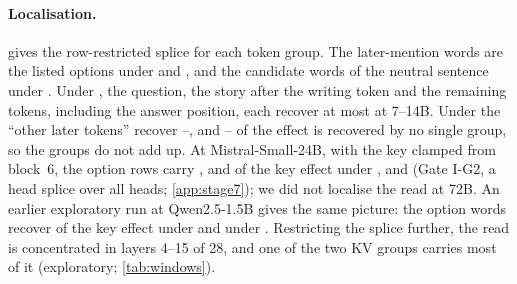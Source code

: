 \begin{table}[!ht]
\centering
\caption{\textbf{Identity, not belief role.} Role effect: mean change in $m = \log p(\text{initial}) - \log p(\textsc{loc})$ when the observer and non-observer are swapped with the same location word (nats). $f_K$, $f_V$: fraction of that change reproduced by clamping only the writing token's key or value (all layers) to the role-swapped run's, as a ratio of means. Direct question; $n = 150$ stories per format and model; 95\% bootstrap CIs. Preregistration E (E2) for \fmtOpt{} and \fmtNone{} in the four 7--14B models; \fmtLetter{} and Qwen2.5-72B exploratory.}
\label{tab:role}

\end{table}

\paragraph{Localisation.}  gives the row-restricted splice for each token group. The later-mention words are the listed options under \fmtOpt{} and \fmtLetter{}, and the candidate words of the neutral sentence under \fmtPost{}. Under \fmtOpt{}, the question, the story after the writing token and the remaining tokens, including the answer position, each recover at most \locScaleOptOtherMax{} at 7--14B. Under \fmtPost{} the ``other later tokens'' recover \locScalePostOtherMin{}--\locScalePostOtherMax{}, and \locScalePostLeftMin{}--\locScalePostLeftMax{} of the effect is recovered by no single group, so the groups do not add up. At Mistral-Small-24B, with the key clamped from block~6, the option rows carry \IgtwoRatioOpt{}, \IgtwoRatioLetter{} and \IgtwoRatioPost{} of the key effect under \fmtOpt{}, \fmtLetter{} and \fmtPost{} (Gate I-G2, a head splice over all heads; \cref{app:stage7}); we did not localise the read at 72B. An earlier exploratory run at Qwen2.5-1.5B gives the same picture: the option words recover \locOptChoicewords{} of the key effect under \fmtOpt{} and \locLetterChoicewords{} under \fmtLetter{}. Restricting the splice further, the read is concentrated in layers 4--15 of 28, and one of the two KV groups carries most of it (exploratory; \cref{tab:windows}).

\begin{table}[!ht]
\centering
\caption{\textbf{Which later tokens read the writing token's key.} Fraction of the full key effect (all tokens see the source key, in every layer) recovered when only one group of later tokens sees it; ratio of mean log-odds changes. ``Other later tokens'' covers the instruction, chat template, prefill and answer position. Qwen2.5-7B, Qwen2.5-14B and Mistral-7B: BF16, $n = 60$ stories per format; preregistration D (D3) for \fmtOpt{} and \fmtPost{}, \fmtLetter{} exploratory. Qwen2.5-1.5B: FP32, $n = 40$, exploratory. 95\% bootstrap CIs. The groups need not add up to one.}
\label{tab:localisation}
{\small}
\end{table}

